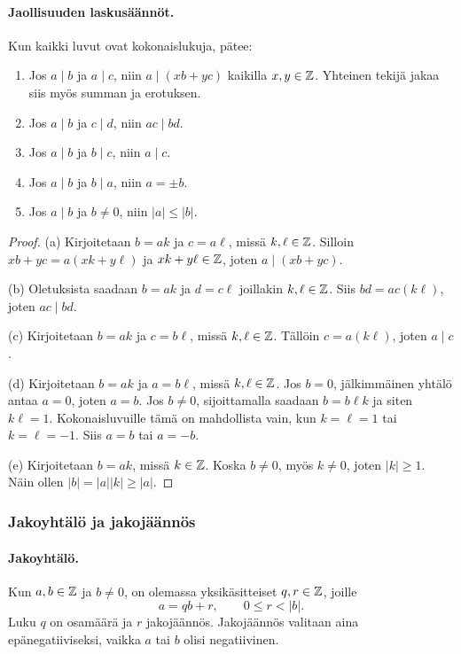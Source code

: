 \documentclass[11pt,a4paper]{amsart}
\begin{document}
\paragraph{Jaollisuuden laskusäännöt.}
Kun kaikki luvut ovat kokonaislukuja, pätee:
\begin{enumerate}[label=(\alph*)]
  \item Jos $a\mid b$ ja $a\mid c$, niin $a\mid (xb+yc)$ kaikilla
    $x,y\in\mathbb{Z}$. Yhteinen tekijä jakaa siis myös summan ja erotuksen.
  \item Jos $a\mid b$ ja $c\mid d$, niin $ac\mid bd$.
  \item Jos $a\mid b$ ja $b\mid c$, niin $a\mid c$.
  \item Jos $a\mid b$ ja $b\mid a$, niin $a=\pm b$.
  \item Jos $a\mid b$ ja $b\ne 0$, niin $|a|\le |b|$.
\end{enumerate}

\begin{proof}
  (a) Kirjoitetaan $b=ak$ ja $c=a\ell$, missä $k,\ell\in\mathbb{Z}$.
  Silloin $xb+yc=a(xk+y\ell)$ ja $xk+y\ell\in\mathbb{Z}$, joten
  $a\mid(xb+yc)$.

  (b) Oletuksista saadaan $b=ak$ ja $d=c\ell$ joillakin
  $k,\ell\in\mathbb{Z}$. Siis $bd=ac(k\ell)$, joten $ac\mid bd$.

  (c) Kirjoitetaan $b=ak$ ja $c=b\ell$, missä $k,\ell\in\mathbb{Z}$.
  Tällöin $c=a(k\ell)$, joten $a\mid c$.

  (d) Kirjoitetaan $b=ak$ ja $a=b\ell$, missä $k,\ell\in\mathbb{Z}$.
  Jos $b=0$, jälkimmäinen yhtälö antaa $a=0$, joten $a=b$.
  Jos $b\ne0$, sijoittamalla saadaan $b=b\ell k$ ja siten
  $k\ell=1$. Kokonaisluvuille tämä on mahdollista vain, kun
  $k=\ell=1$ tai $k=\ell=-1$. Siis $a=b$ tai $a=-b$.

  (e) Kirjoitetaan $b=ak$, missä $k\in\mathbb{Z}$.
  Koska $b\ne0$, myös $k\ne0$, joten $|k|\ge1$.
  Näin ollen $|b|=|a||k|\ge|a|$.
\end{proof}

\subsubsection{Jakoyhtälö ja jakojäännös}

\paragraph{Jakoyhtälö.}
Kun $a,b\in\mathbb{Z}$ ja $b\ne 0$, on olemassa yksikäsitteiset
$q,r\in\mathbb{Z}$, joille
\[
  \boxed{a=qb+r,\qquad 0\le r<|b|.}
\]
Luku $q$ on osamäärä ja $r$ jakojäännös.
Jakojäännös valitaan aina epänegatiiviseksi, vaikka $a$ tai $b$
olisi negatiivinen.
\end{document}
